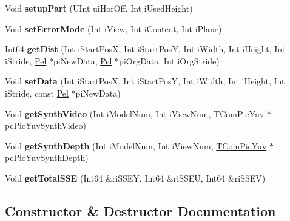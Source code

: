 \begin{DoxyCompactItemize}
\mbox{\label{class_t_ren_model_ad4e2e45fe8440561a2a339073d9b8ce5}} 
Void {\bfseries setup\+Part} (U\+Int ui\+Hor\+Off, Int i\+Used\+Height)
\item 
\mbox{\label{class_t_ren_model_aa60482ca4804a9ee7467447ac0c36a61}} 
Void {\bfseries set\+Error\+Mode} (Int i\+View, Int i\+Content, Int i\+Plane)
\item 
\mbox{\label{class_t_ren_model_ab1d7f9710a45a64b0bc53994c10a9b1d}} 
Int64 {\bfseries get\+Dist} (Int i\+Start\+PosX, Int i\+Start\+PosY, Int i\+Width, Int i\+Height, Int i\+Stride, \hyperlink{_type_def_8h_af92141699657699b4b547be0c8517541}{Pel} $\ast$pi\+New\+Data, \hyperlink{_type_def_8h_af92141699657699b4b547be0c8517541}{Pel} $\ast$pi\+Org\+Data, Int i\+Org\+Stride)
\item 
\mbox{\label{class_t_ren_model_aa38a4aa144606a037682a7292cba48dd}} 
Void {\bfseries set\+Data} (Int i\+Start\+PosX, Int i\+Start\+PosY, Int i\+Width, Int i\+Height, Int i\+Stride, const \hyperlink{_type_def_8h_af92141699657699b4b547be0c8517541}{Pel} $\ast$pi\+New\+Data)
\item 
\mbox{\label{class_t_ren_model_af4380bdf6e47aea3907cca4101403f44}} 
Void {\bfseries get\+Synth\+Video} (Int i\+Model\+Num, Int i\+View\+Num, \hyperlink{class_t_com_pic_yuv}{T\+Com\+Pic\+Yuv} $\ast$pc\+Pic\+Yuv\+Synth\+Video)
\item 
\mbox{\label{class_t_ren_model_ac8453e29ddd2be135ad30eef3e8f3f0b}} 
Void {\bfseries get\+Synth\+Depth} (Int i\+Model\+Num, Int i\+View\+Num, \hyperlink{class_t_com_pic_yuv}{T\+Com\+Pic\+Yuv} $\ast$pc\+Pic\+Yuv\+Synth\+Depth)
\item 
\mbox{\label{class_t_ren_model_aee19d9e94b0a2e3ca9a8e4d7186eabdd}} 
Void {\bfseries get\+Total\+S\+SE} (Int64 \&ri\+S\+S\+EY, Int64 \&ri\+S\+S\+EU, Int64 \&ri\+S\+S\+EV)
\end{DoxyCompactItemize}


\subsection{Constructor \& Destructor Documentation}
\mbox{\label{class_t_ren_model_a50bf8b561b598829d604c82d18638cce}} 
